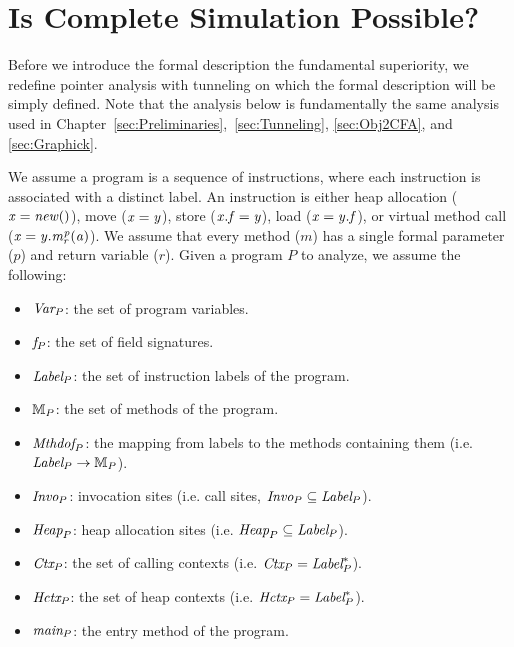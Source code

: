 
\chapter{Is Complete Simulation Possible?}\label{sec:setting}
Before we introduce the formal description the fundamental superiority, we redefine pointer analysis with tunneling on which the formal description will be simply defined. Note that the analysis below is fundamentally the same analysis used in Chapter~\ref{sec:Preliminaries},~\ref{sec:Tunneling}, \ref{sec:Obj2CFA}, and \ref{sec:Graphick}.



\label{sec:pointeranalysis}


We assume a program is a sequence of instructions, where each
instruction is associated with a distinct label.  An instruction is
either heap allocation (${\it x = new()}$), move (${\it x = y}$), 
store (${\it x.f = y}$), load (${\it x = y.f}$),
or
virtual method call (${\it x = y.m_r^{p}(a)}$).  We
assume that every method ($m$) has a single formal parameter ($p$) and
return variable ($r$). 
Given a program $P$ to analyze, we assume the following:
\begin{itemize}[leftmargin=1.4em]
\item $\text{\it Var}_P$: the set of program variables.
\item ${\it f}_P$: the set of field signatures.
\item $\text{\it Label}_P$: the set of instruction labels of the program.
\item ${\mathbb{M}}_P$: the set of methods of the program.
\item $\text{\it Mthdof}_P$: the mapping from labels to the
methods containing them (i.e. $\text{\it Label}_P \to {\mathbb{M}}_P$).
\item $\text{\it Invo}_P$: invocation sites (i.e. call sites, $\text{\it Invo}_P \subseteq \text{\it Label}_P$).
\item $\text{\it Heap}_P$: heap allocation sites (i.e. $\text{\it Heap}_P \subseteq \text{\it Label}_P$).
\item $\text{\it Ctx}_P$: the set of calling contexts (i.e. $\text{\it Ctx}_P = \text{\it Label}_P^*$).
\item $\text{\it Hctx}_P$: the set of heap contexts (i.e. $\text{\it Hctx}_P = \text{\it Label}_P^*$).
\item $\text{\it main}_P$: the entry method of the program.
\end{itemize}


